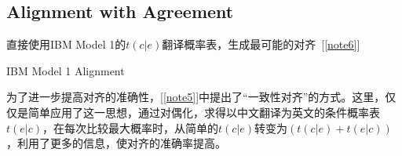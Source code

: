 \documentclass[11pt]{article}
\begin{document}
\subsection{Alignment with Agreement}
\hspace{1.6em} 直接使用IBM Model 1的$t(c|e)$翻译概率表，生成最可能的对齐~[\ref{note6}]
\begin{algorithm}
\caption{IBM Model 1 Alignment}\label{alignment1}
    \begin{algorithmic}
                    \EndIf
                \EndFor
                    \EndIf
                \EndFor
            \EndFor
        \EndFor
    \end{algorithmic}
\end{algorithm}
\newline
\hspace*{1.6em} 为了进一步提高对齐的准确性，[\ref{note5}]中提出了“一致性对齐”的方式。这里，仅仅是简单应用了这一思想，通过对偶化，求得以中文翻译为英文的条件概率表$t(e|c)$，在每次比较最大概率时，从简单的$t(c|e)$转变为$(t(c|e)+t(e|c))$，利用了更多的信息，使对齐的准确率提高。
\end{document}
